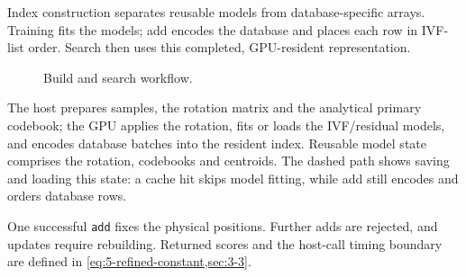 Index construction separates reusable models from database-specific
arrays. Training fits the models; add encodes the database and places
each row in IVF-list order. Search then uses this completed, GPU-resident
representation.

\begin{figure}[!htbp]
\centering
\resizebox{\linewidth}{!}{}
\caption[Build and search workflow]{Build and search workflow.}
\label{fig:4-architecture}
\end{figure}

The host prepares samples, the rotation matrix and the analytical primary
codebook; the GPU applies the rotation, fits or loads the IVF/residual
models, and encodes database batches into the resident index. Reusable
model state comprises the rotation, codebooks and centroids. The dashed
path shows saving and loading this state: a cache hit skips model fitting,
while add still encodes and orders database rows.

One successful \texttt{add} fixes the physical positions. Further adds
are rejected, and updates require rebuilding. Returned scores and the
host-call timing boundary are defined in
\cref{eq:5-refined-constant,sec:3-3}.

